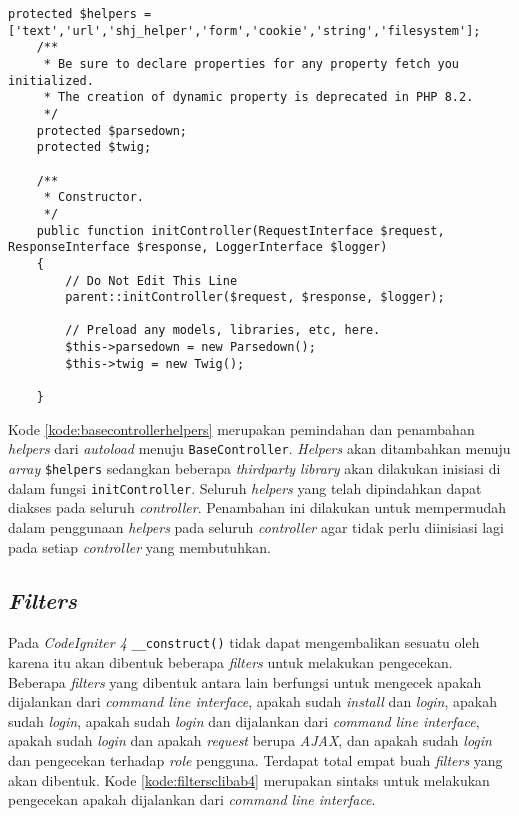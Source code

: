 \begin{lstlisting}[caption=Penambahan sintaks pada \texttt{BaseController}, label=kode:basecontrollerhelpers]
	protected $helpers = ['text','url','shj_helper','form','cookie','string','filesystem'];
	/**
     * Be sure to declare properties for any property fetch you initialized.
     * The creation of dynamic property is deprecated in PHP 8.2.
     */
    protected $parsedown;
    protected $twig;

    /**
     * Constructor.
     */
    public function initController(RequestInterface $request, ResponseInterface $response, LoggerInterface $logger)
    {
        // Do Not Edit This Line
        parent::initController($request, $response, $logger);

        // Preload any models, libraries, etc, here.
        $this->parsedown = new Parsedown();
        $this->twig = new Twig();
        
    }
\end{lstlisting}

Kode \ref{kode:basecontrollerhelpers} merupakan pemindahan dan penambahan \textit{helpers} dari \textit{autoload} menuju \texttt{BaseController}. \textit{Helpers} akan ditambahkan menuju \textit{array} \texttt{\$helpers} sedangkan beberapa \textit{thirdparty library} akan dilakukan inisiasi di dalam fungsi \texttt{initController}. Seluruh \textit{helpers} yang telah dipindahkan dapat diakses pada seluruh \textit{controller}. Penambahan ini dilakukan untuk mempermudah dalam penggunaan \textit{helpers} pada seluruh \textit{controller} agar tidak perlu diinisiasi lagi pada setiap \textit{controller} yang membutuhkan.

\subsection{\textit{Filters}}
Pada \textit{CodeIgniter 4} \texttt{\_\_construct()} tidak dapat mengembalikan sesuatu oleh karena itu akan dibentuk beberapa \textit{filters} untuk melakukan pengecekan. Beberapa \textit{filters} yang dibentuk antara lain berfungsi untuk mengecek apakah dijalankan dari \textit{command line interface}, apakah sudah \textit{install} dan \textit{login}, apakah sudah \textit{login}, apakah sudah \textit{login} dan dijalankan dari \textit{command line interface}, apakah sudah \textit{login} dan apakah \textit{request} berupa \textit{AJAX}, dan apakah sudah \textit{login} dan pengecekan terhadap \textit{role} pengguna. Terdapat total empat buah \textit{filters} yang akan dibentuk. Kode \ref{kode:filtersclibab4} merupakan sintaks untuk melakukan pengecekan apakah dijalankan dari \textit{command line interface}.

